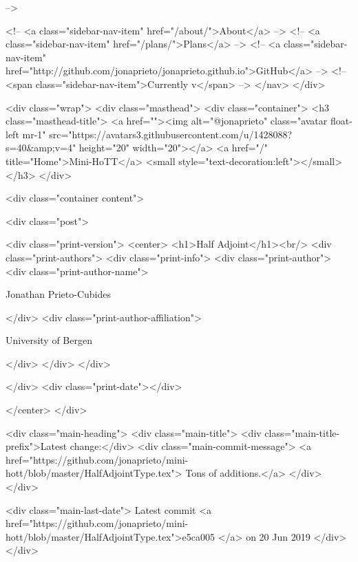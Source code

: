       
     -->

    <!-- <a class="sidebar-nav-item" href="/about/">About</a> -->
    <!-- <a class="sidebar-nav-item" href="/plans/">Plans</a> -->
    <!-- <a class="sidebar-nav-item" href="http://github.com/jonaprieto/jonaprieto.github.io">GitHub</a> -->
    <!-- <span class="sidebar-nav-item">Currently v</span> -->
  </nav>
</div>

    <div class="wrap">
      <div class="masthead">
        <div class="container">
          <h3 class="masthead-title">
            <a href=""><img alt="@jonaprieto" class="avatar float-left mr-1" src="https://avatars3.githubusercontent.com/u/1428088?s=40&amp;v=4" height="20" width="20"></a>
            <a href="/" title="Home">Mini-HoTT</a>
            <small style="text-decoration:left"></small>
          </h3>
        </div>
      
      <div class="container content">
        







<div class="post">

  <div class="print-version">
    <center>
      <h1>Half Adjoint</h1><br/>
        <div class="print-authors">
          <div class="print-info">
            <div class="print-author">
              <div class="print-author-name">
                
                  Jonathan Prieto-Cubides
                
              </div>
              <div class="print-author-affiliation">
                
                  University of Bergen
                
                </div>
            </div>
          </div>
          
          
        </div>
        <div class="print-date"></div>
        
        
    </center>
  </div>

  
  <div class="main-heading">
    <div class="main-title">
      <div class="main-title-prefix">Latest change:</div>
      <div class="main-commit-message">
            <a href="https://github.com/jonaprieto/mini-hott/blob/master/HalfAdjointType.tex">
              Tons of additions.</a>
      </div>
    </div>

    <div class="main-last-date">
      Latest commit <a href="https://github.com/jonaprieto/mini-hott/blob/master/HalfAdjointType.tex">e5ca005 </a> on  20 Jun 2019
    </div>
  </div>
  
